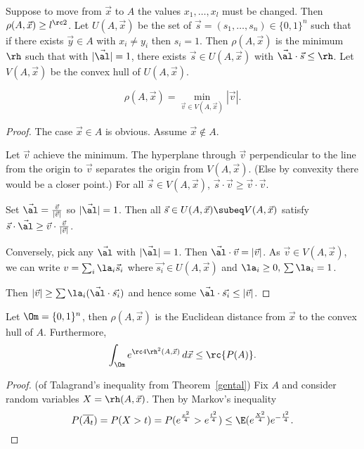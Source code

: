Suppose to move from $\vec x$ to $A$ the values $x_1,\ldots, x_l$ must be changed. Then $\rho(A,\vec x)\ge l^{\rc 2}$. Let $U(A,\vec x)$ be the set of $\vec s=(s_1,\ldots, s_n)\in\{0,1\}^n$ such that if there exists $\vec y\in A$ with $x_i\ne y_i$ then $s_i=1$. Then $\rho(A,\vec x)$ is the minimum $\rh$ such that with $|\vec{\al}|=1$, there exists $\vec s\in U(A,\vec x)$ with $\vec{\al} \cdot \vec{s}\le \rh$. Let $V(A,\vec x)$ be the convex hull of $U(A,\vec x)$.
\begin{thm}
\[\rho(A,\vec x)=\min_{\vec v\in V(A,\vec x)}|\vec v|.\]
\end{thm}
\begin{proof}
The case $\vec x\in A$ is obvious. Assume $\vec x\nin A$. 

Let $\vec v$ achieve the minimum. The hyperplane through $\vec v$ perpendicular to the line from the origin to $\vec v$ separates the origin from $V(A,\vec x)$. (Else by convexity there would be a closer point.) For all $\vec s\in V(A,\vec x)$, $\vec s\cdot \vec v\ge \vec v\cdot \vec v$.

Set $\vec{\al}=\frac{\vec{v}}{|\vec v|}$ so $|\vec{\al}|=1$. Then all $\vec s\in U(A,\vec x)\subeq V(A,\vec x)$ satisfy $\vec s\cdot \vec{\al}\ge \vec{v}\cdot \frac{\vec v}{|\vec v|}$.

Conversely, pick any $\vec{\al}$ with $|\vec{\al}|=1$. Then $\vec{\al}\cdot \vec{v}=|\vec{v}|$. As $\vec{v}\in V(A,\vec x)$, we can write $v=\sum_{i} \la_i\vec s_i$ where $\vec{s_i}\in U(A,\vec x)$ and $\la_i\ge 0, \,\sum \la_i=1$.

Then $|\vec v|\ge\sum \la_i(\vec{\al}\cdot \vec{s_i})$ and hence some $\vec{\al}\cdot \vec{s_i}\le |\vec v|$.
\end{proof}
\begin{thm}\label{gental}
Let $\Om=\{0,1\}^n$, then $\rho(A,\vec x)$ is the Euclidean distance from $\vec x$ to the convex hull of $A$. Furthermore,
\[
\int_{\Om} e^{\rc 4\rh^2(A,\vec x)}\,d\vec x\le \rc{P(A)}.
\]
\end{thm}
\begin{proof} (of Talagrand's inequality from Theorem~\ref{gental}) 
Fix $A$ and consider random variables $X=\rh(A,\vec x)$. Then by Markov's inequality
\[
P(\overline{A_t})=P(X>t)=P(e^{\frac{x^2}{4}}>e^{\frac{t^2}{4}})\le \E(e^{\frac{X^2}{4}}) e^{-\frac{t^2}{4}}.
\]
\end{proof}
